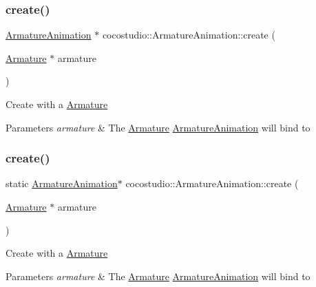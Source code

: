 \subsubsection{\texorpdfstring{create()}{create()}\hspace{0.1cm}{\footnotesize\ttfamily [1/2]}}
{\footnotesize\ttfamily \hyperlink{classcocostudio_1_1ArmatureAnimation}{Armature\+Animation} $\ast$ cocostudio\+::\+Armature\+Animation\+::create (\begin{DoxyParamCaption}\item[{\hyperlink{classcocostudio_1_1Armature}{Armature} $\ast$}]{armature }\end{DoxyParamCaption})\hspace{0.3cm}{\ttfamily [static]}}

Create with a \hyperlink{classcocostudio_1_1Armature}{Armature} 
\begin{DoxyParams}{Parameters}
{\em armature} & The \hyperlink{classcocostudio_1_1Armature}{Armature} \hyperlink{classcocostudio_1_1ArmatureAnimation}{Armature\+Animation} will bind to \\
\hline
\end{DoxyParams}
\mbox{\label{classcocostudio_1_1ArmatureAnimation_afb74b4d9674a8d8f8f7c83305d33a457}} 
\subsubsection{\texorpdfstring{create()}{create()}\hspace{0.1cm}{\footnotesize\ttfamily [2/2]}}
{\footnotesize\ttfamily static \hyperlink{classcocostudio_1_1ArmatureAnimation}{Armature\+Animation}$\ast$ cocostudio\+::\+Armature\+Animation\+::create (\begin{DoxyParamCaption}\item[{\hyperlink{classcocostudio_1_1Armature}{Armature} $\ast$}]{armature }\end{DoxyParamCaption})\hspace{0.3cm}{\ttfamily [static]}}

Create with a \hyperlink{classcocostudio_1_1Armature}{Armature} 
\begin{DoxyParams}{Parameters}
{\em armature} & The \hyperlink{classcocostudio_1_1Armature}{Armature} \hyperlink{classcocostudio_1_1ArmatureAnimation}{Armature\+Animation} will bind to \\
\hline
\end{DoxyParams}
\mbox{\label{classcocostudio_1_1ArmatureAnimation_a5dc76e45a42c7e6f3f163554264e90c5}} 

